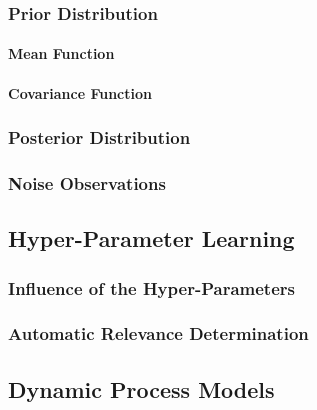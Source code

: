 			\subsubsection{Prior Distribution} %

				\paragraph{Mean Function} %

				\paragraph{Covariance Function} %

			\subsubsection{Posterior Distribution} %

			\subsubsection{Noise Observations} %

		\subsection{Hyper-Parameter Learning} %

			\subsubsection{Influence of the Hyper-Parameters} %

			\subsubsection{Automatic Relevance Determination} %

		\subsection{Dynamic Process Models} %

